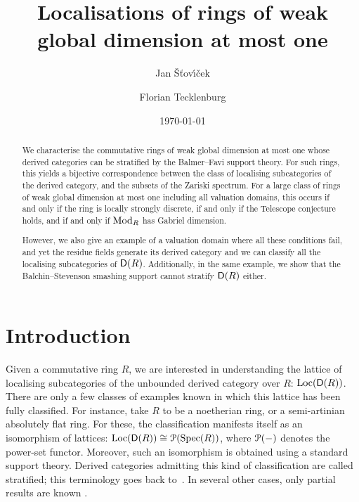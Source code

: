 \documentclass[reqno,a4paper]{amsart}
\title{Localisations of rings of weak global dimension at most one}
\author{Jan {\v{S}}{\v{t}}ov\'{\i}\v{c}ek}
\author{Florian Tecklenburg}
\date{\today}
\begin{document}
\maketitle
\begin{abstract}
%
We characterise the commutative rings of weak global dimension at most one whose derived categories can be stratified by the Balmer--Favi support theory.
For such rings, this yields a bijective correspondence between the class of localising subcategories of the derived category, and the subsets of the Zariski spectrum.
For a large class of rings of weak global dimension at most one including all valuation domains, this occurs if and only if the ring is locally strongly discrete, if and only if the Telescope conjecture holds, and if and only if $\operatorname{Mod}_R$ has Gabriel dimension.
%

However, we also give an example of a valuation domain where all these conditions fail, and yet the residue fields generate its derived category and we can classify all the localising subcategories of $\mathsf{D}(R)$. Additionally, in the same example, we show that the Balchin--Stevenson smashing support cannot stratify $\mathsf{D}(R)$ either.
\end{abstract}
\tableofcontents


\section{Introduction}
Given a commutative ring $R$, we are interested in understanding the lattice of localising subcategories of the unbounded derived category over $R$: $\operatorname{Loc}(\mathsf{D}(R))$. There are only a few classes of examples known in which this lattice has been fully classified. For instance, take $R$ to be a noetherian ring, or a semi-artinian absolutely flat ring. For these, the classification manifests itself as an isomorphism of lattices: $\operatorname{Loc}(\mathsf{D}(R))\cong\operatorname{\mathcal{P}}(\operatorname{Spec}(R))$, where $\operatorname{\mathcal{P}}(-)$ denotes the power-set functor.
Moreover, such an isomorphism is obtained using a standard support theory. Derived categories admitting this kind of classification are called stratified; this terminology goes back to~\cite{bik11}.
In several other cases, only partial results are known \cite{neemanchromtower,stevenson_absolutelyflatrings,isolated}.
\end{document}
